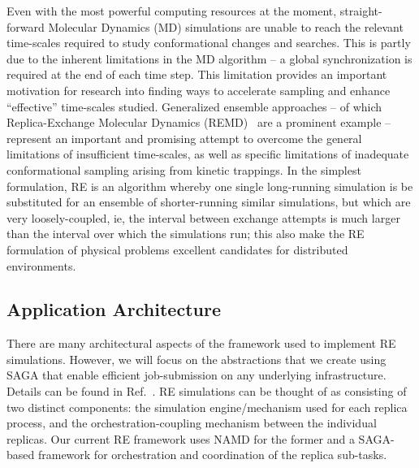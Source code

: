 \documentclass{llncs}
\begin{document}
Even with the most powerful computing resources at the moment,
straight-forward Molecular Dynamics (MD) simulations are unable to
reach the relevant time-scales required to study conformational
changes and searches. This is partly due to the inherent limitations
in the MD algorithm -- a global synchronization is required at the end
of each time step.  This limitation provides an important motivation
for research into finding ways to accelerate sampling and enhance
``effective'' time-scales studied. Generalized ensemble approaches --
of which Replica-Exchange Molecular Dynamics
(REMD)~\cite{Sugita:1999rm} are a prominent example -- represent an
important and promising attempt to overcome the general limitations of
insufficient time-scales, as well as specific limitations of
inadequate conformational sampling arising from kinetic trappings.  In
the simplest formulation, RE is an algorithm whereby one
single long-running simulation is be substituted for an ensemble of
shorter-running similar simulations, but which are very
loosely-coupled, ie, the interval between exchange attempts is much
larger than the interval over which the simulations run; this also
make the RE formulation of physical problems excellent
candidates for distributed environments.


\up

\subsection{Application Architecture}

\up

There are many architectural aspects of the framework used to
implement RE simulations. However, we will focus on the abstractions
that we create using SAGA that enable efficient job-submission on any
underlying infrastructure.  Details can be found in
Ref.~\cite{repex_ptrsa, repex_escience08}. RE simulations can be
thought of as consisting of two distinct components: the simulation
engine/mechanism used for each replica process, and the
orchestration-coupling mechanism between the individual replicas. Our
current RE framework uses NAMD for the former and a SAGA-based
framework for orchestration and coordination of the replica sub-tasks.
\end{document}
